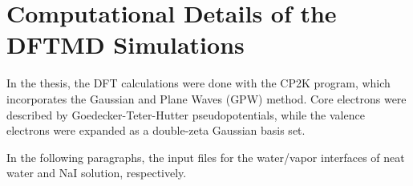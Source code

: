 \chapter{Computational Details of the DFTMD Simulations}\label{computational_detail}
In the thesis, the DFT calculations were done with the CP2K program, which incorporates the Gaussian and Plane Waves (GPW) method\cite{GL99}. 
Core electrons were described by Goedecker-Teter-Hutter pseudopotentials\cite{MK05}, while the valence electrons were expanded as a double-zeta Gaussian basis set.


In the following paragraphs, the input files for the water/vapor interfaces of neat water and NaI solution, respectively.

